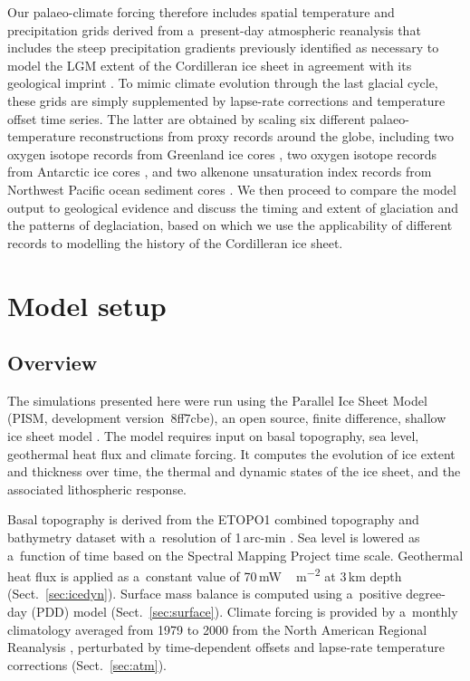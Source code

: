 \documentclass[tc, manuscript]{copernicus}
\begin{document}
      Our palaeo-climate forcing therefore includes spatial temperature and
      precipitation grids derived from a~present-day atmospheric reanalysis
      \citep{Mesinger.etal.2006} that includes the steep precipitation
      gradients previously identified as necessary to model the LGM extent
      of the Cordilleran ice sheet in agreement with its geological imprint
      \citep{Seguinot.etal.2014}. To mimic climate evolution through the
      last glacial cycle, these grids are simply supplemented by lapse-rate
      corrections and temperature offset time series. The latter are
      obtained by scaling six different palaeo-temperature reconstructions
      from proxy records around the globe, including two oxygen isotope
      records from Greenland ice cores \citep{Dansgaard.etal.1993,
      Andersen.etal.2004}, two oxygen isotope records from Antarctic ice
      cores \citep{Petit.etal.1999,Jouzel.etal.2007}, and two alkenone
      unsaturation index records from Northwest Pacific ocean sediment cores
      \citep{Herbert.etal.2001}. We then proceed to compare the model output
      to geological evidence and discuss the timing and extent of glaciation
      and the patterns of deglaciation, based on which we use the
      applicability of different records to modelling the history of the
      Cordilleran ice sheet.


\section{Model setup}
\label{sec:model}

\subsection{Overview}
\label{sec:overview}%

      The simulations presented here were run using the Parallel Ice Sheet
      Model (PISM, development version~8ff7cbe), an open source, finite
      difference, shallow ice sheet model \citep{PISM-authors.2015}. The
      model requires input on basal topography, sea level, geothermal heat
      flux and climate forcing. It computes the evolution of ice extent and
      thickness over time, the thermal and dynamic states of the ice sheet,
      and the associated lithospheric response.

      Basal topography is derived from the ETOPO1 combined topography and
      bathymetry dataset with a~resolution of 1\,arc-min
      \citep{Amante.Eakins.2009}. Sea level is lowered as a~function of time
      based on the Spectral Mapping Project
      \citep[SPECMAP,][]{Imbrie.etal.1989} time scale. Geothermal heat flux
      is applied as a~constant value of 70\,\unit{mW\,m^{-2}} at
      3\,\unit{km} depth (Sect.~\ref{sec:icedyn}). Surface mass balance is
      computed using a~positive degree-day (PDD) model
      (Sect.~\ref{sec:surface}). Climate forcing is provided by a~monthly
      climatology averaged from 1979 to 2000 from the North American
      Regional Reanalysis \citep[NARR,][]{Mesinger.etal.2006}, perturbated
      by time-dependent offsets and lapse-rate temperature corrections
      (Sect.~\ref{sec:atm}).
\end{document}
